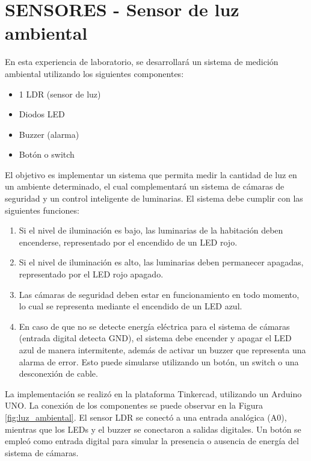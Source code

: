 \section{SENSORES - Sensor de luz ambiental}


En esta experiencia de laboratorio, se desarrollará un sistema de medición ambiental utilizando los siguientes componentes: 
\begin{itemize}
    \item 1 LDR (sensor de luz)
    \item Diodos LED
    \item Buzzer (alarma)
    \item Botón o switch
\end{itemize}

El objetivo es implementar un sistema que permita medir la cantidad de luz en un ambiente determinado, el cual complementará un sistema de cámaras de seguridad y un control inteligente de luminarias. El sistema debe cumplir con las siguientes funciones:
\begin{enumerate}
    \item Si el nivel de iluminación es bajo, las luminarias de la habitación deben encenderse, representado por el encendido de un LED rojo.
    \item Si el nivel de iluminación es alto, las luminarias deben permanecer apagadas, representado por el LED rojo apagado.
    \item Las cámaras de seguridad deben estar en funcionamiento en todo momento, lo cual se representa mediante el encendido de un LED azul.
    \item En caso de que no se detecte energía eléctrica para el sistema de cámaras (entrada digital detecta GND), el sistema debe encender y apagar el LED azul de manera intermitente, además de activar un buzzer que representa una alarma de error. Esto puede simularse utilizando un botón, un switch o una desconexión de cable.
\end{enumerate}

La implementación se realizó en la plataforma Tinkercad, utilizando un Arduino UNO. La conexión de los componentes se puede observar en la Figura \ref{fig:luz_ambiental}. El sensor LDR se conectó a una entrada analógica (A0), mientras que los LEDs y el buzzer se conectaron a salidas digitales. Un botón se empleó como entrada digital para simular la presencia o ausencia de energía del sistema de cámaras.

